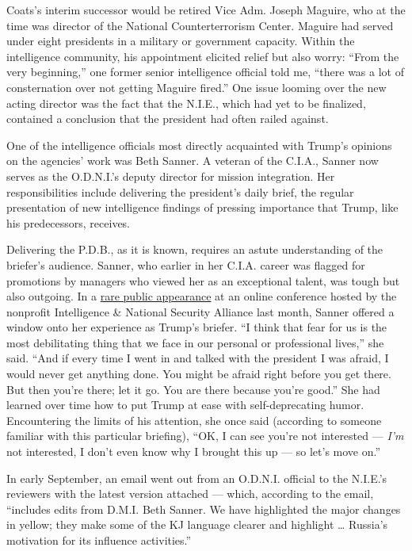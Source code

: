 Coats's interim successor would be retired Vice Adm. Joseph Maguire, who
at the time was director of the National Counterterrorism Center.
Maguire had served under eight presidents in a military or government
capacity. Within the intelligence community, his appointment elicited
relief but also worry: ``From the very beginning,'' one former senior
intelligence official told me, ``there was a lot of consternation over
not getting Maguire fired.'' One issue looming over the new acting
director was the fact that the N.I.E., which had yet to be finalized,
contained a conclusion that the president had often railed against.

One of the intelligence officials most directly acquainted with Trump's
opinions on the agencies' work was Beth Sanner. A veteran of the C.I.A.,
Sanner now serves as the O.D.N.I.'s deputy director for mission
integration. Her responsibilities include delivering the president's
daily brief, the regular presentation of new intelligence findings of
pressing importance that Trump, like his predecessors, receives.

Delivering the P.D.B., as it is known, requires an astute understanding
of the briefer's audience. Sanner, who earlier in her C.I.A. career was
flagged for promotions by managers who viewed her as an exceptional
talent, was tough but also outgoing. In a
\href{https://www.youtube.com/watch?v=OZhW72KH9lk}{rare public
appearance} at an online conference hosted by the nonprofit Intelligence
\& National Security Alliance last month, Sanner offered a window onto
her experience as Trump's briefer. ``I think that fear for us is the
most debilitating thing that we face in our personal or professional
lives,'' she said. ``And if every time I went in and talked with the
president I was afraid, I would never get anything done. You might be
afraid right before you get there. But then you're there; let it go. You
are there because you're good.'' She had learned over time how to put
Trump at ease with self-deprecating humor. Encountering the limits of
his attention, she once said (according to someone familiar with this
particular briefing), ``OK, I can see you're not interested ---
\emph{I'm} not interested, I don't even know why I brought this up ---
so let's move on.''

In early September, an email went out from an O.D.N.I. official to the
N.I.E.'s reviewers with the latest version attached --- which, according
to the email, ``includes edits from D.M.I. Beth Sanner. We have
highlighted the major changes in yellow; they make some of the KJ
language clearer and highlight \ldots{} Russia's motivation for its
influence activities.''

